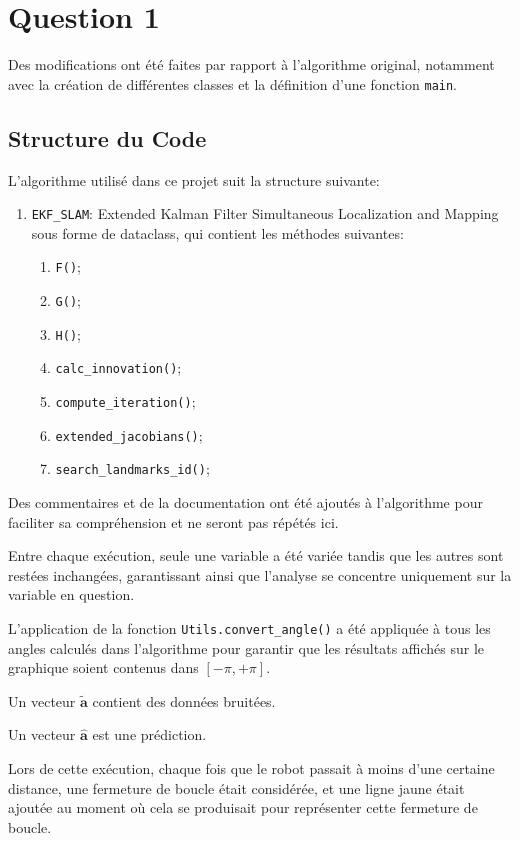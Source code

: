 \documentclass[../CSC_5RO12_TA_TP4.tex]{subfiles}
\begin{document}
\section{Question 1}
\begin{remark}
    Des modifications ont été faites par rapport à l'algorithme original, notamment avec la création de différentes classes et la définition d'une fonction \texttt{main}.
\end{remark}

\subsection{Structure du Code}
\noindent L'algorithme utilisé dans ce projet suit la structure suivante:
\begin{enumerate}
    \item \texttt{EKF\_SLAM}: Extended Kalman Filter Simultaneous Localization and Mapping sous forme de dataclass, qui contient les méthodes suivantes:
    \begin{enumerate}[noitemsep]
        \item \texttt{F()};
        \item \texttt{G()};
        \item \texttt{H()};
        \item \texttt{calc\_innovation()};
        \item \texttt{compute\_iteration()};
        \item \texttt{extended\_jacobians()};
        \item \texttt{search\_landmarks\_id()};
    \end{enumerate}
\end{enumerate}
\begin{remark}
    Des commentaires et de la documentation ont été ajoutés à l'algorithme pour faciliter sa compréhension et ne seront pas répétés ici.
\end{remark}
\begin{remark}
    Entre chaque exécution, seule une variable a été variée tandis que les autres sont restées inchangées, garantissant ainsi que l'analyse se concentre uniquement sur la variable en question.
\end{remark}
\begin{remark}
    L'application de la fonction \texttt{Utils.convert\_angle()} a été appliquée à tous les angles calculés dans l'algorithme pour garantir que les résultats affichés sur le graphique soient contenus dans $[-\pi, +\pi]$.
\end{remark}
\begin{remark}
    Un vecteur $\widetilde{\mathbf{a}}$ contient des données bruitées.
\end{remark}
\begin{remark}
    Un vecteur $\hat{\mathbf{a}}$ est une prédiction.
\end{remark}
\begin{remark}
    Lors de cette exécution, chaque fois que le robot passait à moins d'une certaine distance, une fermeture de boucle était considérée, et une ligne jaune était ajoutée au moment où cela se produisait pour représenter cette fermeture de boucle.
\end{remark}
\end{document}
